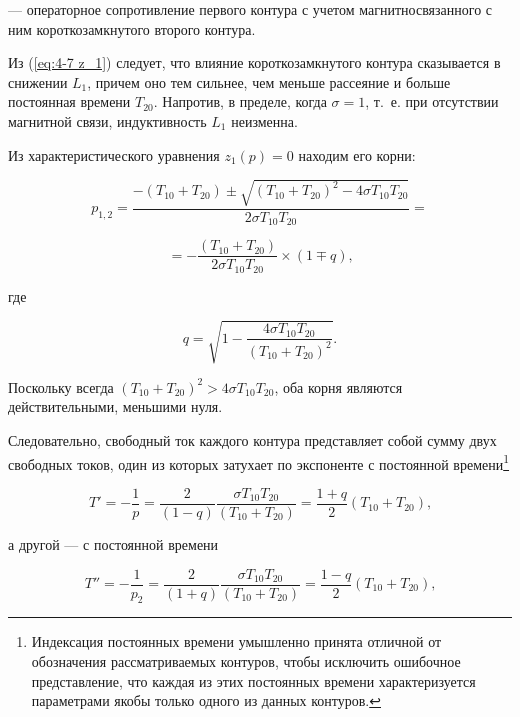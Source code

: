 — операторное сопротивление первого контура с учетом магнитносвязанного с ним короткозамкнутого второго контура.

Из (\ref{eq:4-7 z_1}) следует, что влияние короткозамкнутого контура сказывается в снижении $ L_1 $, причем оно тем сильнее, чем меньше рассеяние и больше постоянная времени $ T_{20} $. Напротив, в пределе, когда $ \sigma = 1 $, т.~е. при отсутствии магнитной связи, индуктивность $ L_1 $ неизменна.

Из характеристического уравнения $ z_1(p) = 0 $ находим его корни:

\begin{equation*}
    \label{eq:4-8 p_1,2}
    p_{1,2} = \frac{-(T_{10}+T_{20}) \pm \sqrt{(T_{10}+T_{20})^2-4\sigma T_{10}T_{20}}}{2 \sigma T_{10}T_{20}}=
\end{equation*}

\begin{equation}
    =-\frac{(T_{10}+T_{20})}{2 \sigma T_{10}T_{20}} \times (1 \mp q) \text{,}
\end{equation}

где

\begin{equation}
    \label{eq:4-9 q}
    q=\sqrt{1-\frac{4\sigma T_{10}T_{20}}{(T_{10}+T_{20})^2}}\text{.}
\end{equation}

Поскольку всегда $ (T_{10}+T_{20})^2 > 4\sigma T_{10}T_{20} $, оба корня являются действительными, меньшими нуля.

Следовательно, свободный ток каждого контура представляет собой сумму двух свободных токов, один из которых затухает по экспоненте с постоянной времени\footnote{Индексация постоянных времени умышленно принята отличной от обозначения рассматриваемых контуров, чтобы исключить ошибочное представление, что каждая из этих постоянных времени характеризуется параметрами якобы только одного из данных контуров.}

\begin{equation}
    \label{eq:4-10 T}
    T'=-\frac{1}{p}=\frac{2}{(1-q)}\frac{\sigma T_{10}T_{20}}{(T_{10}+T_{20})}=\frac{1+q}{2}(T_{10}+T_{20})\text{,}
\end{equation}

а другой — с постоянной времени

\begin{equation}
    \label{eq:4-11 T''}
    T''=-\frac{1}{p_2}=\frac{2}{(1+q)}\frac{\sigma T_{10}T_{20}}{(T_{10}+T_{20})}=\frac{1-q}{2}(T_{10}+T_{20})\text{,}
\end{equation}

